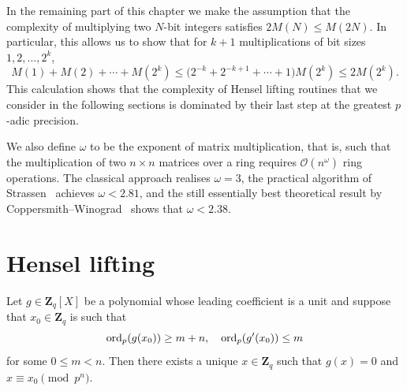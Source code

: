 In the remaining part of this chapter we make the assumption that 
the complexity of multiplying two $N$-bit integers satisfies 
$2 M(N) \leq M(2 N)$.  In particular, this allows us to show that 
for $k + 1$ multiplications of bit sizes $1, 2, \dotsc, 2^k$, 
\begin{equation*}
M(1) + M(2) + \dotsb + M(2^k) \leq \bigl( 2^{-k} + 2^{-k+1} + \dotsb + 1 \bigr) M(2^k) \leq 2 M(2^k).
\end{equation*}
This calculation shows that the complexity of Hensel lifting routines 
that we consider in the following sections is dominated by their last 
step at the greatest $p$-adic precision.

We also define $\omega$ to be the exponent of matrix multiplication, 
that is, such that the multiplication of two $n \times n$ matrices 
over a ring requires $\mathcal{O}(n^{\omega})$ ring operations.  The 
classical approach realises $\omega = 3$, the practical algorithm 
of Strassen~\citep{Strassen1969} achieves $\omega < 2.81$, and 
the still essentially best theoretical result by 
Coppersmith--Winograd~\citep{CoppersmithWinograd1990} shows 
that $\omega < 2.38$.

\section{Hensel lifting}

\begin{thm} \label{thm:Hensel1}
Let $g \in \mathbf{Z}_q[X]$ be a polynomial whose leading coefficient 
is a unit and suppose that $x_0 \in \mathbf{Z}_q$ is such that 
\begin{equation*}
\operatorname{ord}_p(g(x_0)) \geq m + n, \quad \operatorname{ord}_p(g'(x_0)) \leq m
\end{equation*}
for some $0 \leq m < n$.  Then there exists a unique $x \in \mathbf{Z}_q$ 
such that $g(x) = 0$ and $x \equiv x_0 \pmod{p^n}$.
\end{thm}

